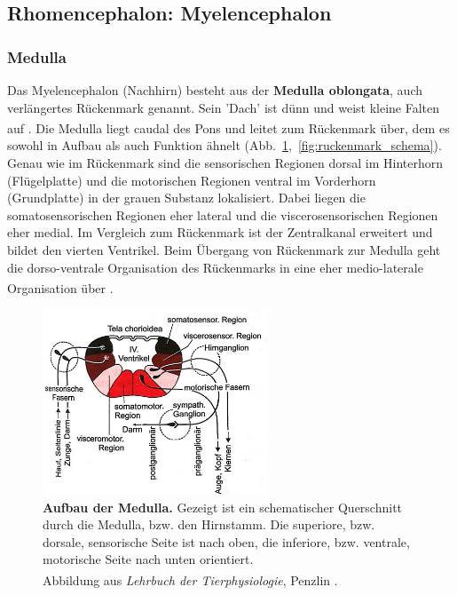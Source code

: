 
\subsection{Rhomencephalon: Myelencephalon}
\label{subsec:Myelencephalon} 

\subsubsection{Medulla} 

Das Myelencephalon (Nachhirn) besteht aus der \textbf{Medulla oblongata}, auch verlängertes Rückenmark genannt. Sein 'Dach' ist dünn und weist kleine Falten auf \textsuperscript{\cite[Kap.~6]{storch2012lehrbuchzoo}}. Die Medulla liegt caudal des Pons und leitet zum Rückenmark über, dem es sowohl in Aufbau als auch Funktion ähnelt (Abb.~\ref{fig:medulla_schema},~\ref{fig:ruckenmark_schema}). Genau wie im Rückenmark sind die sensorischen Regionen dorsal im Hinterhorn (Flügelplatte) und die motorischen Regionen ventral im Vorderhorn (Grundplatte) in der grauen Substanz lokalisiert. Dabei liegen die somatosensorischen Regionen eher lateral und die viscerosensorischen Regionen eher medial. Im Vergleich zum Rückenmark ist der Zentralkanal erweitert und bildet den vierten Ventrikel. Beim Übergang von Rückenmark zur Medulla geht die dorso-ventrale Organisation des Rückenmarks in eine eher medio-laterale Organisation über \textsuperscript{\cite[Kap.~14]{penzlin2005tierphys}}.

\begin{figure}[H]
    \centering
    \includegraphics[width=0.6\textwidth]{pictures/Bilder_Jule/Andere/medulla_schema.jpg}
    \caption[Aufbau der Medulla]{\textbf{Aufbau der Medulla.} Gezeigt ist ein schematischer Querschnitt durch die Medulla, bzw. den Hirnstamm. Die superiore, bzw. dorsale, sensorische Seite ist nach oben, die inferiore, bzw. ventrale, motorische Seite nach unten orientiert.\\
    Abbildung aus \textit{Lehrbuch der Tierphysiologie}, Penzlin {\textsuperscript{\cite[Kap.~14]{penzlin2005tierphys}}}.}
    \label{fig:medulla_schema}
\end{figure}{}

